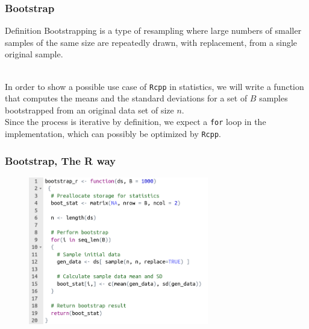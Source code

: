 \documentclass{beamer}
\def\code#1{\texttt{#1}} %
\begin{document}

\begin{frame}
\frametitle{Bootstrap}

\begin{alertblock}{Definition}
\alert{Bootstrapping} is a type of resampling where large numbers of smaller samples of the same size are repeatedly drawn, with replacement, from a single original sample.
\end{alertblock}

\\
\vspace{3mm}
In order to show a possible use case of \code{Rcpp} in statistics, we will write a function that computes the means and the standard deviations for a set of $B$ samples bootstrapped from an original data set of size $n$.
\\
\vspace{3mm}
Since the process is iterative by definition, we expect a \code{for} loop in the implementation, which can possibly be optimized by \code{Rcpp}.
\end{frame}


\begin{frame}
\frametitle{Bootstrap, The R way}

\begin{figure}[b1]
    \includegraphics[width=0.7\textwidth]{bootstrap_r.png}
\end{figure}

\end{frame}
\end{document}

